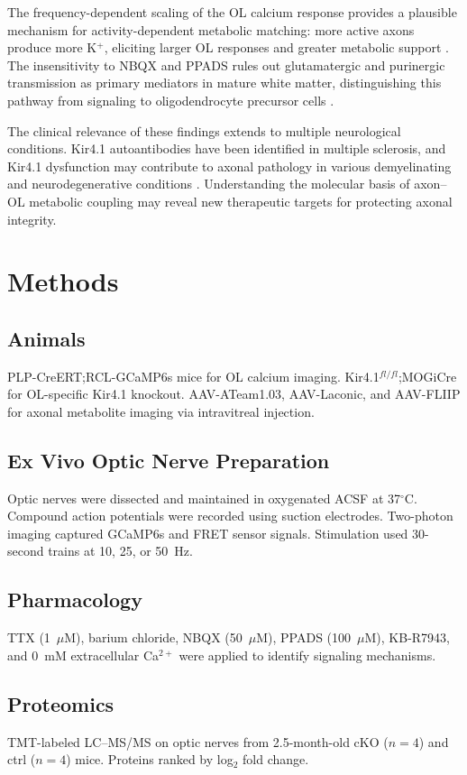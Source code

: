 \documentclass[11pt]{article}
\begin{document}
The frequency-dependent scaling of the OL calcium response provides a plausible mechanism for activity-dependent metabolic matching: more active axons produce more K$^+$, eliciting larger OL responses and greater metabolic support \citep{nave2010myelination, simons2014oligodendrocytes}. The insensitivity to NBQX and PPADS rules out glutamatergic and purinergic transmission as primary mediators in mature white matter, distinguishing this pathway from signaling to oligodendrocyte precursor cells \citep{bergles2000glutamatergic}.

The clinical relevance of these findings extends to multiple neurological conditions. Kir4.1 autoantibodies have been identified in multiple sclerosis, and Kir4.1 dysfunction may contribute to axonal pathology in various demyelinating and neurodegenerative conditions \citep{larson2018oligodendrocyte}. Understanding the molecular basis of axon--OL metabolic coupling may reveal new therapeutic targets for protecting axonal integrity.

\section{Methods}

\subsection{Animals}
PLP-CreERT;RCL-GCaMP6s mice for OL calcium imaging. Kir4.1$^{fl/fl}$;MOGiCre for OL-specific Kir4.1 knockout. AAV-ATeam1.03, AAV-Laconic, and AAV-FLIIP for axonal metabolite imaging via intravitreal injection.

\subsection{Ex Vivo Optic Nerve Preparation}
Optic nerves were dissected and maintained in oxygenated ACSF at 37$^\circ$C. Compound action potentials were recorded using suction electrodes. Two-photon imaging captured GCaMP6s and FRET sensor signals. Stimulation used 30-second trains at 10, 25, or 50~Hz.

\subsection{Pharmacology}
TTX (1~$\mu$M), barium chloride, NBQX (50~$\mu$M), PPADS (100~$\mu$M), KB-R7943, and 0~mM extracellular Ca$^{2+}$ were applied to identify signaling mechanisms.

\subsection{Proteomics}
TMT-labeled LC--MS/MS on optic nerves from 2.5-month-old cKO ($n = 4$) and ctrl ($n = 4$) mice. Proteins ranked by log$_2$ fold change.
\end{document}
